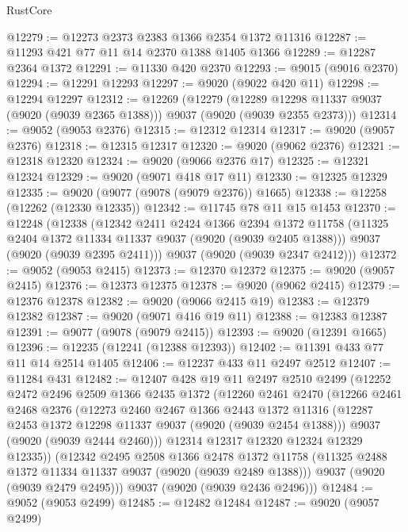 \begin{lexlean}{RustCore}
\begin{coremodule}
@12279 := @12273 @2373 @2383 @1366 @2354 @1372 @11316
@12287 := @11293 @421 @77 @11 @14 @2370 @1388 @1405 @1366
@12289 := @12287 @2364 @1372
@12291 := @11330 @420 @2370
@12293 := @9015 (@9016 @2370)
@12294 := @12291 @12293
@12297 := @9020 (@9022 @420 @11)
@12298 := @12294 @12297
@12312 := @12269
    (@12279
      (@12289 @12298 @11337 @9037 (@9020 (@9039 @2365 @1388)))
      @9037
      (@9020 (@9039 @2355 @2373)))
@12314 := @9052 (@9053 @2376)
@12315 := @12312 @12314
@12317 := @9020 (@9057 @2376)
@12318 := @12315 @12317
@12320 := @9020 (@9062 @2376)
@12321 := @12318 @12320
@12324 := @9020 (@9066 @2376 @17)
@12325 := @12321 @12324
@12329 := @9020 (@9071 @418 @17 @11)
@12330 := @12325 @12329
@12335 := @9020 (@9077 (@9078 (@9079 @2376)) @1665)
@12338 := @12258 (@12262 (@12330 @12335))
@12342 := @11745 @78 @11 @15 @1453
@12370 := @12248
    (@12338
      (@12342
        @2411
        @2424
        @1366
        @2394
        @1372
        @11758
        (@11325 @2404 @1372 @11334 @11337 @9037 (@9020 (@9039 @2405 @1388)))
        @9037
        (@9020 (@9039 @2395 @2411)))
      @9037
      (@9020 (@9039 @2347 @2412)))
@12372 := @9052 (@9053 @2415)
@12373 := @12370 @12372
@12375 := @9020 (@9057 @2415)
@12376 := @12373 @12375
@12378 := @9020 (@9062 @2415)
@12379 := @12376 @12378
@12382 := @9020 (@9066 @2415 @19)
@12383 := @12379 @12382
@12387 := @9020 (@9071 @416 @19 @11)
@12388 := @12383 @12387
@12391 := @9077 (@9078 (@9079 @2415))
@12393 := @9020 (@12391 @1665)
@12396 := @12235 (@12241 (@12388 @12393))
@12402 := @11391 @433 @77 @11 @14 @2514 @1405
@12406 := @12237 @433 @11 @2497 @2512
@12407 := @11284 @431
@12482 := @12407
    @428
    @19
    @11
    @2497
    @2510
    @2499
    (@12252
      @2472
      @2496
      @2509
      @1366
      @2435
      @1372
      (@12260
        @2461
        @2470
        (@12266
          @2461
          @2468
          @2376
          (@12273
            @2460
            @2467
            @1366
            @2443
            @1372
            @11316
            (@12287 @2453 @1372 @12298 @11337 @9037 (@9020 (@9039 @2454 @1388)))
            @9037
            (@9020 (@9039 @2444 @2460)))
          @12314
          @12317
          @12320
          @12324
          @12329
          @12335))
      (@12342
        @2495
        @2508
        @1366
        @2478
        @1372
        @11758
        (@11325 @2488 @1372 @11334 @11337 @9037 (@9020 (@9039 @2489 @1388)))
        @9037
        (@9020 (@9039 @2479 @2495)))
      @9037
      (@9020 (@9039 @2436 @2496)))
@12484 := @9052 (@9053 @2499)
@12485 := @12482 @12484
@12487 := @9020 (@9057 @2499)

\end{coremodule}
\end{lexlean}
